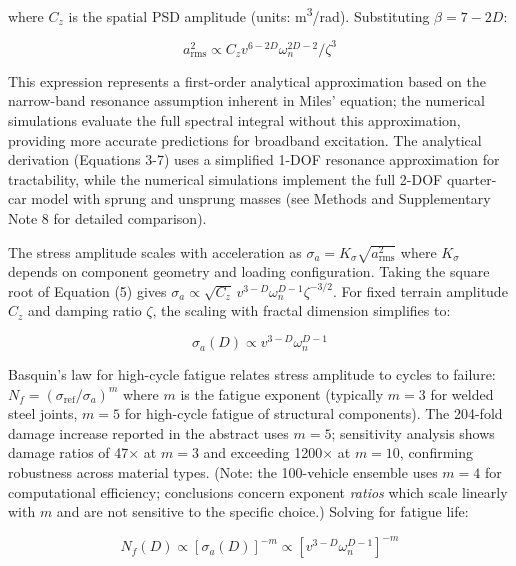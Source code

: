 \documentclass[11pt]{article}
\begin{document}
where $C_z$ is the spatial PSD amplitude (units: m\textsuperscript{3}/rad). Substituting $\beta = 7-2D$:

\begin{equation}
a_{\text{rms}}^2 \propto C_z v^{6-2D} \omega_n^{2D-2} / \zeta^3
\end{equation}

This expression represents a first-order analytical approximation based on the narrow-band resonance assumption inherent in Miles' equation; the numerical simulations evaluate the full spectral integral without this approximation, providing more accurate predictions for broadband excitation. The analytical derivation (Equations 3-7) uses a simplified 1-DOF resonance approximation for tractability, while the numerical simulations implement the full 2-DOF quarter-car model with sprung and unsprung masses (see Methods and Supplementary Note 8 for detailed comparison).

The stress amplitude scales with acceleration as $\sigma_a = K_\sigma \sqrt{a_{\text{rms}}^2}$ where $K_\sigma$ depends on component geometry and loading configuration. Taking the square root of Equation (5) gives $\sigma_a \propto \sqrt{C_z} \, v^{3-D} \omega_n^{D-1} \zeta^{-3/2}$. For fixed terrain amplitude $C_z$ and damping ratio $\zeta$, the scaling with fractal dimension simplifies to:

\begin{equation}
\sigma_a(D) \propto v^{3-D} \omega_n^{D-1}
\end{equation}

Basquin's law for high-cycle fatigue relates stress amplitude to cycles to failure: $N_f = (\sigma_{\text{ref}}/\sigma_a)^m$ where $m$ is the fatigue exponent (typically $m = 3$ for welded steel joints, $m = 5$ for high-cycle fatigue of structural components)\cite{Basquin1910,Dowling2013}. The 204-fold damage increase reported in the abstract uses $m = 5$; sensitivity analysis shows damage ratios of 47$\times$ at $m = 3$ and exceeding 1200$\times$ at $m = 10$, confirming robustness across material types. (Note: the 100-vehicle ensemble uses $m = 4$ for computational efficiency; conclusions concern exponent \emph{ratios} which scale linearly with $m$ and are not sensitive to the specific choice.) Solving for fatigue life:

\begin{equation}
N_f(D) \propto [\sigma_a(D)]^{-m} \propto [v^{3-D} \omega_n^{D-1}]^{-m}
\end{equation}
\end{document}
